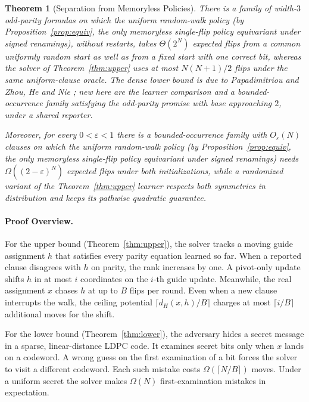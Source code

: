 \documentclass[11pt,a4paper]{article}
\newtheorem{theorem}{Theorem}[section]
\theoremstyle{definition}
\theoremstyle{remark}
\begin{document}
\begin{theorem}[Separation from Memoryless Policies]\label{thm:sep}
There is a family of width-$3$ odd-parity formulas on which the uniform random-walk policy (by Proposition~\ref{prop:equiv}, the only memoryless single-flip policy equivariant under signed renamings), without restarts, takes $\Theta(2^N)$ expected flips from a common uniformly random start as well as from a fixed start with one correct bit, whereas the solver of Theorem~\ref{thm:upper} uses at most $N(N+1)/2$ flips under the same uniform-clause oracle. The dense lower bound is due to Papadimitriou \cite{papadimitriou1991} and Zhou, He and Nie \cite[Proposition~2]{zhou2009}; new here are the learner comparison and a bounded-occurrence family satisfying the odd-parity promise with base approaching $2$, under a shared reporter.

Moreover, for every $0<\varepsilon<1$ there is a bounded-occurrence family with $O_\varepsilon(N)$ clauses on which the uniform random-walk policy (by Proposition~\ref{prop:equiv}, the only memoryless single-flip policy equivariant under signed renamings) needs $\Omega((2-\varepsilon)^N)$ expected flips under both initializations, while a randomized variant of the Theorem~\ref{thm:upper} learner respects both symmetries in distribution and keeps its pathwise quadratic guarantee.
\end{theorem}

\paragraph{Proof Overview.}
For the upper bound (Theorem~\ref{thm:upper}), the solver tracks a moving guide assignment $h$ that satisfies every parity equation learned so far. When a reported clause disagrees with $h$ on parity, the rank increases by one. A pivot-only update shifts $h$ in at most $i$ coordinates on the $i$-th guide update. Meanwhile, the real assignment $x$ chases $h$ at up to $B$ flips per round. Even when a new clause interrupts the walk, the ceiling potential $\lceil d_H(x,h)/B\rceil$ charges at most $\lceil i/B\rceil$ additional moves for the shift.

For the lower bound (Theorem~\ref{thm:lower}), the adversary hides a secret message in a sparse, linear-distance LDPC code. It examines secret bits only when $x$ lands on a codeword. A wrong guess on the first examination of a bit forces the solver to visit a different codeword. Each such mistake costs $\Omega(\lceil N/B\rceil)$ moves. Under a uniform secret the solver makes $\Omega(N)$ first-examination mistakes in expectation.
\end{document}
